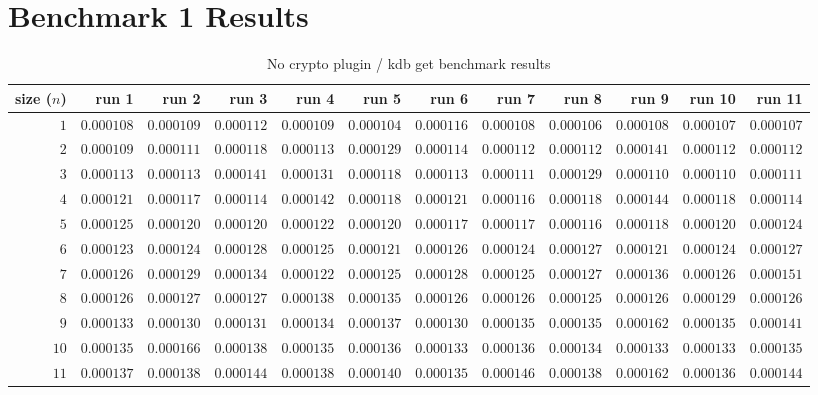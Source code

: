 \chapter{Benchmark 1 Results}
\label{chapter-benchmark-results}
\begin{sidewaystable} \centering \caption{No crypto plugin / kdb get benchmark results} \label{eval-table-no-crypto-get} \scriptsize \begin{tabular}{r|rrrrrrrrrrr} size ($n$) & run 1 & run 2 & run 3 & run 4 & run 5 & run 6 & run 7 & run 8 & run 9 & run 10 & run 11\\ \hline
$1$ & $0.000108$ & $0.000109$ & $0.000112$ & $0.000109$ & $0.000104$ & $0.000116$ & $0.000108$ & $0.000106$ & $0.000108$ & $0.000107$ & $0.000107$ \\
$2$ & $0.000109$ & $0.000111$ & $0.000118$ & $0.000113$ & $0.000129$ & $0.000114$ & $0.000112$ & $0.000112$ & $0.000141$ & $0.000112$ & $0.000112$ \\
$3$ & $0.000113$ & $0.000113$ & $0.000141$ & $0.000131$ & $0.000118$ & $0.000113$ & $0.000111$ & $0.000129$ & $0.000110$ & $0.000110$ & $0.000111$ \\
$4$ & $0.000121$ & $0.000117$ & $0.000114$ & $0.000142$ & $0.000118$ & $0.000121$ & $0.000116$ & $0.000118$ & $0.000144$ & $0.000118$ & $0.000114$ \\
$5$ & $0.000125$ & $0.000120$ & $0.000120$ & $0.000122$ & $0.000120$ & $0.000117$ & $0.000117$ & $0.000116$ & $0.000118$ & $0.000120$ & $0.000124$ \\
$6$ & $0.000123$ & $0.000124$ & $0.000128$ & $0.000125$ & $0.000121$ & $0.000126$ & $0.000124$ & $0.000127$ & $0.000121$ & $0.000124$ & $0.000127$ \\
$7$ & $0.000126$ & $0.000129$ & $0.000134$ & $0.000122$ & $0.000125$ & $0.000128$ & $0.000125$ & $0.000127$ & $0.000136$ & $0.000126$ & $0.000151$ \\
$8$ & $0.000126$ & $0.000127$ & $0.000127$ & $0.000138$ & $0.000135$ & $0.000126$ & $0.000126$ & $0.000125$ & $0.000126$ & $0.000129$ & $0.000126$ \\
$9$ & $0.000133$ & $0.000130$ & $0.000131$ & $0.000134$ & $0.000137$ & $0.000130$ & $0.000135$ & $0.000135$ & $0.000162$ & $0.000135$ & $0.000141$ \\
$10$ & $0.000135$ & $0.000166$ & $0.000138$ & $0.000135$ & $0.000136$ & $0.000133$ & $0.000136$ & $0.000134$ & $0.000133$ & $0.000133$ & $0.000135$ \\
$11$ & $0.000137$ & $0.000138$ & $0.000144$ & $0.000138$ & $0.000140$ & $0.000135$ & $0.000146$ & $0.000138$ & $0.000162$ & $0.000136$ & $0.000144$ \\

\end{tabular}
\end{sidewaystable}
